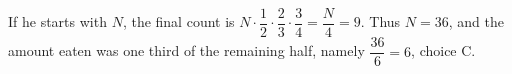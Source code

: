 If he starts with $N$, the final count is $N\cdot\dfrac{1}{2}\cdot\dfrac{2}{3}\cdot\dfrac{3}{4}=\dfrac{N}{4}=9$. Thus $N=36$, and the amount eaten was one third of the remaining half, namely $\dfrac{36}{6}=\boxed6$, choice C.
